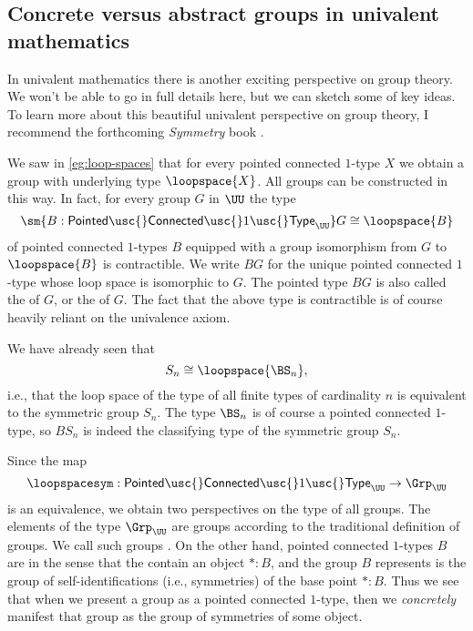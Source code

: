 \subsection{Concrete versus abstract groups in univalent mathematics}

In univalent mathematics there is another exciting perspective on group theory. We won't be able to go in full details here, but we can sketch some of key ideas. To learn more about this beautiful univalent perspective on group theory, I recommend the forthcoming \emph{Symmetry} book \cite{symmetrybook}.

We saw in \cref{eg:loop-spaces} that for every pointed connected $1$-type $X$ we obtain a group with underlying type $\loopspace{X}$. All groups can be constructed in this way. In fact, for every group $G$ in $\UU$ the type
\begin{equation*}
  \sm{B:\mathsf{Pointed\usc{}Connected\usc{}}1\mathsf{\usc{}Type}_\UU}G\cong\loopspace{B}
\end{equation*}
of pointed connected $1$-types $B$ equipped with a group isomorphism from $G$ to $\loopspace{B}$ is contractible. We write $BG$ for the unique pointed connected $1$-type whose loop space is isomorphic to $G$. The pointed type $BG$ is also called the  of $G$, or the  of $G$. The fact that the above type is contractible is of course heavily reliant on the univalence axiom.

\begin{eg}
  We have already seen that
  \begin{equation*}
    S_n\cong\loopspace{\BS_n},
  \end{equation*}
  i.e., that the loop space of the type of all finite types of cardinality $n$ is equivalent to the symmetric group $S_n$. The type $\BS_n$ is of course a pointed connected $1$-type, so $BS_n$ is indeed the classifying type of the symmetric group $S_n$.
\end{eg}

Since the map
\begin{equation*}
  \loopspacesym:\mathsf{Pointed\usc{}Connected\usc{}}1\mathsf{\usc{}Type}_\UU\to\Grp_\UU
\end{equation*}
is an equivalence, we obtain two perspectives on the type of all groups. The elements of the type $\Grp_\UU$ are groups according to the traditional definition of groups. We call such groups . On the other hand, pointed connected $1$-types $B$ are  in the sense that the contain an object $\ast:B$, and the group $B$ represents is the group of self-identifications (i.e., symmetries) of the base point $\ast:B$. Thus we see that when we present a group as a pointed connected $1$-type, then we \emph{concretely} manifest that group as the group of symmetries of some object.

